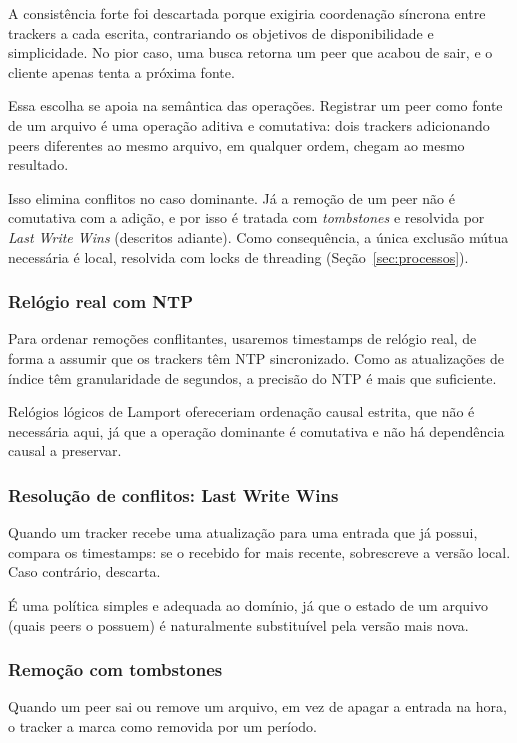 \documentclass[12pt, a4paper]{article}
\begin{document}
A consistência forte foi descartada porque exigiria coordenação síncrona entre trackers a cada escrita, contrariando os objetivos de disponibilidade e simplicidade. No pior caso, uma busca retorna um peer que acabou de sair, e o cliente apenas tenta a próxima fonte.

Essa escolha se apoia na semântica das operações. Registrar um peer como fonte de um arquivo é uma operação aditiva e comutativa: dois trackers adicionando peers diferentes ao mesmo arquivo, em qualquer ordem, chegam ao mesmo resultado. 

Isso elimina conflitos no caso dominante. Já a remoção de um peer não é comutativa com a adição, e por isso é tratada com \textit{tombstones} e resolvida por \textit{Last Write Wins} (descritos adiante). Como consequência, a única exclusão mútua necessária é local, resolvida com locks de threading (Seção~\ref{sec:processos}).

\subsubsection*{Relógio real com NTP}
Para ordenar remoções conflitantes, usaremos timestamps de relógio real, de forma a assumir que os trackers têm NTP sincronizado. Como as atualizações de índice têm granularidade de segundos, a precisão do NTP é mais que suficiente. 

Relógios lógicos de Lamport ofereceriam ordenação causal estrita, que não é necessária aqui, já que a operação dominante é comutativa e não há dependência causal a preservar.

\subsubsection*{Resolução de conflitos: Last Write Wins}
Quando um tracker recebe uma atualização para uma entrada que já possui, compara os timestamps: se o recebido for mais recente, sobrescreve a versão local. Caso contrário, descarta.

É uma política simples e adequada ao domínio, já que o estado de um arquivo (quais peers o possuem) é naturalmente substituível pela versão mais nova.

\subsubsection*{Remoção com tombstones}
Quando um peer sai ou remove um arquivo, em vez de apagar a entrada na hora, o tracker a marca como removida por um período. 
\end{document}
